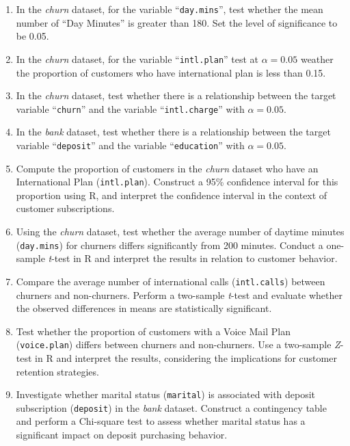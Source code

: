 \documentclass[
]{book}
\newcommand{\passthrough}[1]{#1}
\theoremstyle{definition}
\theoremstyle{definition}
\theoremstyle{definition}
\theoremstyle{definition}
\theoremstyle{remark}
\begin{document}
\begin{enumerate}
\def\labelenumi{\arabic{enumi}.}
\setcounter{enumi}{15}
\item
  In the \emph{churn} dataset, for the variable ``\passthrough{\lstinline!day.mins!}'', test whether the mean number of ``Day Minutes'' is greater than 180. Set the level of significance to be 0.05.
\item
  In the \emph{churn} dataset, for the variable ``\passthrough{\lstinline!intl.plan!}'' test at \(\alpha=0.05\) weather the proportion of customers who have international plan is less than 0.15.
\item
  In the \emph{churn} dataset, test whether there is a relationship between the target variable ``\passthrough{\lstinline!churn!}'' and the variable ``\passthrough{\lstinline!intl.charge!}'' with \(\alpha=0.05\).
\item
  In the \emph{bank} dataset, test whether there is a relationship between the target variable ``\passthrough{\lstinline!deposit!}'' and the variable ``\passthrough{\lstinline!education!}'' with \(\alpha=0.05\).
\item
  Compute the proportion of customers in the \emph{churn} dataset who have an International Plan (\passthrough{\lstinline!intl.plan!}). Construct a 95\% confidence interval for this proportion using R, and interpret the confidence interval in the context of customer subscriptions.
\item
  Using the \emph{churn} dataset, test whether the average number of daytime minutes (\passthrough{\lstinline!day.mins!}) for churners differs significantly from 200 minutes. Conduct a one-sample \emph{t}-test in R and interpret the results in relation to customer behavior.
\item
  Compare the average number of international calls (\passthrough{\lstinline!intl.calls!}) between churners and non-churners. Perform a two-sample \emph{t}-test and evaluate whether the observed differences in means are statistically significant.
\item
  Test whether the proportion of customers with a Voice Mail Plan (\passthrough{\lstinline!voice.plan!}) differs between churners and non-churners. Use a two-sample \emph{Z}-test in R and interpret the results, considering the implications for customer retention strategies.
\item
  Investigate whether marital status (\passthrough{\lstinline!marital!}) is associated with deposit subscription (\passthrough{\lstinline!deposit!}) in the \emph{bank} dataset. Construct a contingency table and perform a Chi-square test to assess whether marital status has a significant impact on deposit purchasing behavior.

\end{enumerate}
\end{document}
